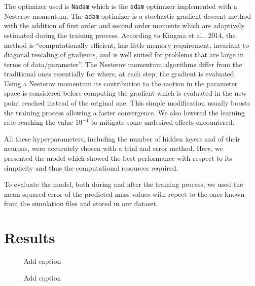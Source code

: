 \documentclass[a4paper,10pt]{report}
\begin{document}
The optimizer used is \lstinline{Nadam} which is the \lstinline{adam} optimizer implemented with a Nesterov momentum.
The \lstinline{adam} optimizer is a stochastic gradient descent method with the addition of first order and second order moments
which are adaptively estimated during the training process. According to
 Kingma et al., 2014, 
 the method is ``computationally efficient, has little memory requirement, 
 invariant to diagonal rescaling of gradients, 
 and is well suited for problems that are large in terms of data/parameter''.
The Nesterov momentum algorithms differ from the traditional ones essentially for where, at each step, the gradient is evaluated.
Using a Nesterov momentum its contribution to the motion in the parameter space is considered before computing the gradient 
which is evaluated in the new point reached instead of the original one. This simple modification usually boosts the training process allowing
a faster convergence.
We also lowered the learning rate reaching the value $10^{-4}$ to mitigate some undesired effects encountered.

All these hyperparameters, including the number of hidden layers and of their neurons, were accurately chosen
with a trial and error method. Here, we presented the model which showed the best performance with respect to its simplicity
and thus the computational resources required.

To evaluate the model, both during and after the training process, we used the mean squared error of the predicted mass values 
with repect to the ones known from the simulation files and stored in our dataset.

\section{Results}

\begin{figure}
    \begin{center}
        
    \end{center}
    \caption{Add caption}
\end{figure}

\begin{figure}
    \begin{center}
        
    \end{center}
    \caption{Add caption}
\end{figure}
\end{document}
